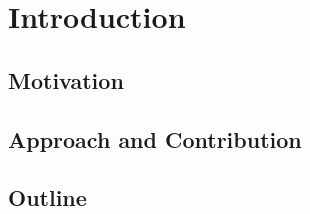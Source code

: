 \chapter{Introduction}
  \section{ Motivation}
  \section{Approach and Contribution}
  \section{Outline}
